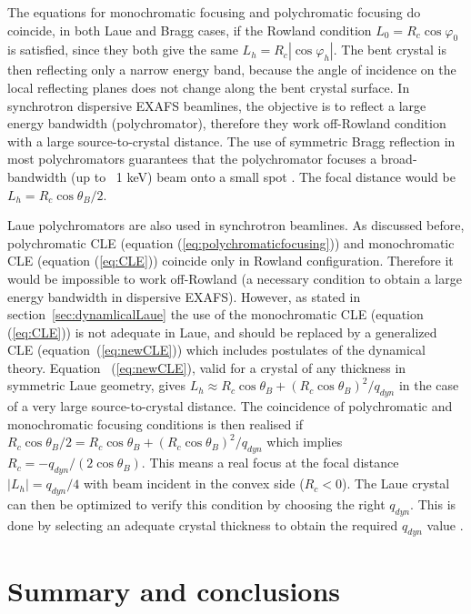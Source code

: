 \documentclass[preprint]{iucr}              %
\begin{document}
The equations for monochromatic focusing and polychromatic focusing do coincide, in both Laue and Bragg cases, if the Rowland condition $L_0=R_c\cos\varphi_0$ is satisfied, since they both give the same $L_h=R_c|\cos\varphi_h|$. The bent crystal is then reflecting only a narrow energy band, because the angle of incidence on the local reflecting planes does not change along the bent crystal surface.
In synchrotron dispersive EXAFS beamlines, the objective is to reflect a large energy bandwidth (polychromator), therefore they work off-Rowland condition with a large source-to-crystal distance. The use of symmetric Bragg reflection in most polychromators guarantees that the polychromator focuses a broad-bandwidth (up to ~1 keV) beam onto a small spot \cite{Tolentino:ms0206}. The focal distance would be $L_h=R_c\cos\theta_B/2$.

Laue polychromators are also used in synchrotron beamlines.
As discussed before,
polychromatic CLE (equation (\ref{eq:polychromaticfocusing})) and monochromatic CLE (equation (\ref{eq:CLE})) coincide only in Rowland configuration. Therefore it would be impossible to work off-Rowland  (a necessary condition to obtain a large energy bandwidth in dispersive EXAFS). However, as stated in section~\ref{sec:dynamlicalLaue} the use of the monochromatic CLE (equation (\ref{eq:CLE})) is not adequate in Laue, and should be replaced by a generalized CLE (equation~(\ref{eq:newCLE})) which includes postulates of the dynamical theory.
Equation ~(\ref{eq:newCLE}), valid for a crystal of any thickness in symmetric Laue geometry, gives $L_h \approx R_c \cos\theta_B + (R_c \cos\theta_B) ^2 / q_{dyn}$ in the case of a very large source-to-crystal distance. The coincidence of polychromatic and monochromatic focusing conditions is then realised if
$R_c \cos\theta_B /2 = R_c \cos\theta_B+ (R_c \cos\theta_B) ^2 / q_{dyn}$ which implies $R_c=-q_{dyn}/(2\cos\theta_B)$.
This means a real focus at the focal distance $|L_h|=q_{dyn}/4$ with beam incident in the convex side ($R_c<0$). The Laue crystal can then be optimized to verify this condition by choosing the right $q_{dyn}$. This is done by selecting an adequate crystal thickness to obtain the required $q_{dyn}$ value \cite{Mocella2004} \cite{Mocella2008}. 


\section{Summary and conclusions}
\label{sec:summary}
\end{document}
